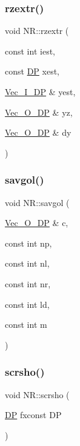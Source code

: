 \subsubsection{\texorpdfstring{rzextr()}{rzextr()}}
{\footnotesize\ttfamily void N\+R\+::rzextr (\begin{DoxyParamCaption}\item[{const int}]{iest,  }\item[{const \mbox{\hyperlink{namespaceNR_af6ff762dd605ff477b8e52387253a02a}{DP}}}]{xest,  }\item[{\mbox{\hyperlink{namespaceNR_a9f943da53862537c552e2a770cb170ae}{Vec\+\_\+\+I\+\_\+\+DP}} \&}]{yest,  }\item[{\mbox{\hyperlink{namespaceNR_a970094d23441f8ef6a45282a7eb2103d}{Vec\+\_\+\+O\+\_\+\+DP}} \&}]{yz,  }\item[{\mbox{\hyperlink{namespaceNR_a970094d23441f8ef6a45282a7eb2103d}{Vec\+\_\+\+O\+\_\+\+DP}} \&}]{dy }\end{DoxyParamCaption})}

\mbox{\label{namespaceNR_a8c8d71cc60561155b11e42e028ee3b8c}} 
\subsubsection{\texorpdfstring{savgol()}{savgol()}}
{\footnotesize\ttfamily void N\+R\+::savgol (\begin{DoxyParamCaption}\item[{\mbox{\hyperlink{namespaceNR_a970094d23441f8ef6a45282a7eb2103d}{Vec\+\_\+\+O\+\_\+\+DP}} \&}]{c,  }\item[{const int}]{np,  }\item[{const int}]{nl,  }\item[{const int}]{nr,  }\item[{const int}]{ld,  }\item[{const int}]{m }\end{DoxyParamCaption})}

\mbox{\label{namespaceNR_adc488f409f614650e59bd201350349ee}} 
\subsubsection{\texorpdfstring{scrsho()}{scrsho()}}
{\footnotesize\ttfamily void N\+R\+::scrsho (\begin{DoxyParamCaption}\item[{\mbox{\hyperlink{namespaceNR_af6ff762dd605ff477b8e52387253a02a}{DP}} }]{fxconst DP }\end{DoxyParamCaption})}

